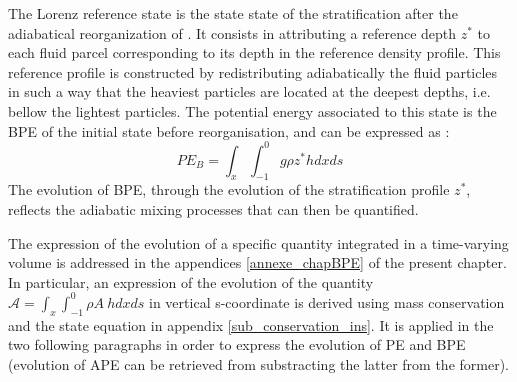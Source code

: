 The Lorenz reference state is the state state of the stratification after the adiabatical reorganization of \citet{lorenz_available_1955}. It consists in attributing a reference depth $z^*$ to each fluid parcel corresponding to its depth in the reference density profile. This reference profile is constructed by redistributing adiabatically the fluid particles in such a way that the heaviest particles are located at the deepest depths, i.e. bellow the lightest particles. The potential energy associated to this state is the BPE of the initial state before reorganisation, and can be expressed as :
\begin{equation}
    PE_B = \int_x \int_{-1}^0 g \rho z^* h dx ds
\end{equation}
The evolution of BPE, through the evolution of the stratification profile $z^*$, reflects the adiabatic mixing processes that can then be quantified.



The expression of the evolution of a specific quantity integrated in a time-varying volume is addressed in the appendices \ref{annexe_chapBPE} of the present chapter. In particular, an expression of the evolution of the quantity 
$\mathcal{A}=\int_x\int_{-1}^0\rho A\ hdx ds$
in vertical s-coordinate is derived using mass conservation and the state equation in appendix \ref{sub_conservation_ins}. It is applied in the two following paragraphs in order to express the evolution of PE and BPE (evolution of APE can be retrieved from substracting the latter from the former).


